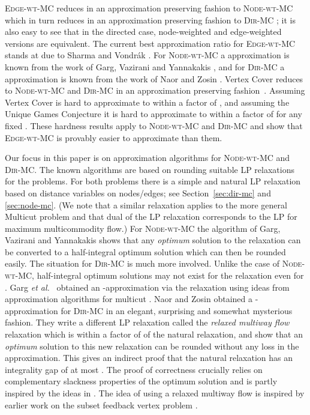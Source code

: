 \documentclass[11pt]{article}
\newcommand{\etal}{{\em et al.}~}
\def\MC{\textsc{Edge-wt-MC}\xspace}
\def\DirMC{\textsc{Dir-MC}\xspace}
\def\NodeMC{\textsc{Node-wt-MC}\xspace}
\def\NodeMC{\textsc{Node-wt-MC}\xspace}
\begin{document}
\MC reduces in an approximation preserving fashion to \NodeMC which in
turn reduces in an approximation preserving fashion to \DirMC
\cite{GargVY04}; it is also easy to see that in the directed case,
node-weighted and edge-weighted versions are equivalent. The current
best approximation ratio for \MC stands at  due to Sharma and
Vondr\'ak \cite{SharmaV14}. For \NodeMC a  approximation is
known from the work of Garg, Vazirani and Yannakakis \cite{GargVY04},
and for \DirMC a  approximation is known from the work of Naor and
Zosin \cite{NaorZ01}.  {\sc Vertex Cover} reduces to \NodeMC and
\DirMC in an approximation preserving
fashion~\cite{GargVY04}. Assuming  {\sc Vertex Cover} is
hard to approximate to within a factor of  \cite{DinurS05}, and
assuming the Unique Games Conjecture it is hard to approximate to
within a factor of  for any fixed 
\cite{KhotR08}. These hardness results apply to \NodeMC and \DirMC and
show that \MC is provably easier to approximate than them.

Our focus in this paper is on approximation algorithms for \NodeMC and
\DirMC. The known algorithms are based on rounding suitable LP
relaxations for the problems. For both problems there is a simple and
natural LP relaxation based on distance variables on nodes/edges; see
Section~\ref{sec:dir-mc} and \ref{sec:node-mc}. (We note that a
similar relaxation applies to the more general {\sc Multicut} problem
and that dual of the LP relaxation corresponds to the LP for maximum
multicommodity flow.)  \iffalse In fact the approximation bounds of
 and  also establish the same upper bounds on the
integrality gap of this natural relaxation.  However, the rounding
schemes are far from trivial.  \fi For \NodeMC the algorithm of Garg,
Vazirani and Yannakakis \cite{GargVY04} shows that any {\em optimum}
solution to the relaxation can be converted to a half-integral optimum
solution which can then be rounded easily.  The situation for \DirMC
is much more involved. Unlike the case of \NodeMC, half-integral
optimum solutions may not exist for the relaxation even for .
Garg \etal \cite{GargVY94} obtained an -approximation via
the relaxation using ideas from approximation algorithms for multicut
\cite{GVY}.  Naor and Zosin obtained a -approximation for \DirMC in
an elegant, surprising and somewhat mysterious fashion. They write a
different LP relaxation called the {\em relaxed multiway flow}
relaxation which is within a factor of  of the natural relaxation,
and show that an {\em optimum} solution to this new relaxation can be
rounded without any loss in the approximation. This gives an indirect
proof that the natural relaxation has an integrality gap of at most
. The proof of correctness crucially relies on complementary
slackness properties of the optimum solution and is partly inspired by
the ideas in \cite{GargVY04}. The idea of using a relaxed multiway
flow is inspired by earlier work on the subset feedback vertex problem
\cite{EvenNZ00}.
\end{document}
